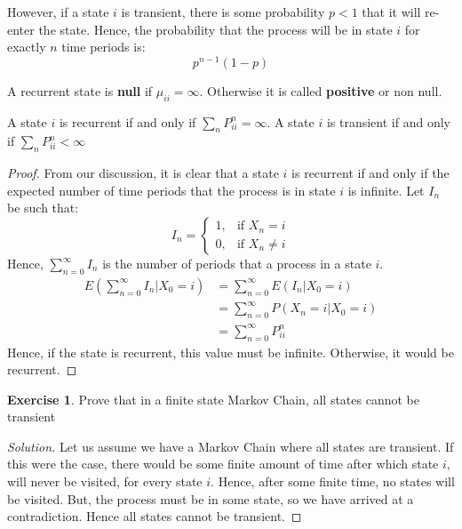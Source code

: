 \documentclass[12pt,letterpaper]{amsbook}
\theoremstyle{definition}
\newtheorem*{exercise}{Exercise}
\newenvironment{solution}
  {\renewcommand\qedsymbol{$\blacksquare$}\begin{proof}[Solution]}
  {\end{proof}}
\begin{document}
However, if a state $i$ is transient, there is some probability $p < 1$ that it will re-enter the state. Hence, the probability that the process will be in state $i$ for exactly $n$ time periods is:
\[p^{n-1} (1-p)\]

A recurrent state is \textbf{null} if $\mu_{ii} = \infty$. Otherwise it is called \textbf{positive} or non null.

\begin{theorem}
  A state $i$ is recurrent if and only if $\sum_n P_{ii}^n = \infty$. A state $i$ is transient if and only if $\sum_n P_{ii}^n < \infty$  
\end{theorem}
\begin{proof}
  From our discussion, it is clear that a state $i$ is recurrent if and only if the expected number of time periods that the process is in state $i$ is infinite. Let $I_n$ be such that:
  \[I_n = \begin{cases}
    1, & \text{if } X_n = i \\
    0, & \text{if } X_n \neq i
  \end{cases}\]
  Hence, $\sum_{n=0}^{\infty} I_n$ is the number of periods that a process in a state $i$.
  \begin{align*}
    E \left( \sum_{n=0}^{\infty} I_n | X_0 = i\right) &= \sum_{n=0}^{\infty} E(I_n | X_0 = i) \\
                                                      &= \sum_{n=0}^{\infty} P(X_n = i | X_0 = i) \\
                                                      &= \sum_{n=0}^{\infty} P_{ii}^n
  \end{align*}
  Hence, if the state is recurrent, this value must be infinite. Otherwise, it would be recurrent.
\end{proof}

\begin{exercise}
  Prove that in a finite state Markov Chain, all states cannot be transient 
\end{exercise}
\begin{solution}
Let us assume we have a Markov Chain where all states are transient. If this were the case, there would be some finite amount of time after which state $i$, will never be visited, for every state $i$. Hence, after some finite time, no states will be visited. But, the process must be in some state, so we have arrived at a contradiction. Hence all states cannot be transient.
\end{solution}
\end{document}
